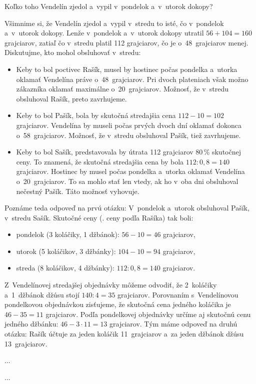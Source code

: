 {%
\napad
Koľko toho Vendelín zjedol a~vypil v~pondelok a~v~utorok dokopy?

\riesenie
Všimnime si, že Vendelín zjedol a~vypil v~stredu to isté, čo v~pondelok
a~v~utorok dokopy. Lenže v~pondelok a~v~utorok dokopy utratil
$56+104=160$ grajciarov, zatiaľ čo v~stredu platil 112 grajciarov, čo je
o~48~grajciarov menej. Diskutujme, kto mohol obsluhovať v~stredu:
\begin{itemize}
\item Keby to bol poctivec Rašík, musel by hostinec počas pondelka a~utorka
oklamať Vendelína práve o~48~grajciarov. Pri dvoch plateniach však možno
zákazníka oklamať maximálne o~20~grajciarov. Možnosť, že v~stredu
obsluhoval Rašík, preto zavrhujeme.
\item Keby to bol Pašík, bola by skutočná stredajšia cena $112-10=102$
grajciarov. Vendelína by museli počas prvých dvoch dní oklamať dokonca o~58~grajciarov.
Možnosť, že v~stredu obsluhoval Pašík, tiež zavrhujeme.
\item Keby to bol Sašík, predstavovala by útrata 112 grajciarov 80\,\%
skutočnej ceny.
To znamená, že skutočná stredajšia cena by bola $112:0{,}8=140$
grajciarov. Hostinec by musel počas pondelka a~utorka oklamať Vendelína o~20~grajciarov.
To sa mohlo stať len vtedy, ak ho v~oba dni obsluhoval
nečestný Pašík. Táto možnosť vyhovuje.
\end{itemize}
Poznáme teda odpoveď na prvú otázku: V~pondelok a~utorok obsluhoval Pašík,
v~stredu Sašík. Skutočné ceny (\tj. ceny podľa Rašíka) tak boli:
\begin{itemize}
\item pondelok (3 koláčiky, 1 džbánok): $56-10=46$ grajciarov,
\item utorok (5 koláčikov, 3 džbánky): $104-10=94$ grajciarov,
\item streda (8 koláčikov, 4 džbánky): $112:0{,}8=140$ grajciarov.
\end{itemize}
Z~Vendelínovej stredajšej objednávky môžeme odvodiť, že 2~koláčiky a~1~džbánok
džúsu stojí $140:4=35$ grajciarov.
Porovnaním s~Vendelínovou pondelkovou objednávkou zisťujeme, že skutočná cena
jedného koláčika je $46-35=11$ grajciarov.
Podľa pondelkovej objednávky určíme aj skutočnú cenu jedného džbánku:
$46-3\cdot11=13$ grajciarov.
Tým máme odpoveď na druhú otázku: Rašík účtuje za jeden koláčik 11~grajciarov
a~za jeden džbánok džúsu 13~grajciarov.
}

{%
...}

{%
...}

